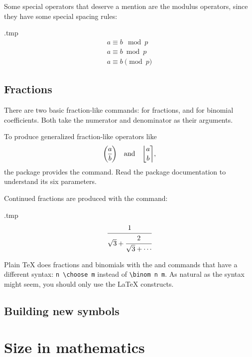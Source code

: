 
Some special operators that deserve a mention are the modulus operators,
since they have some special spacing rules:
%
\begin{VerbatimOut}{\jobname.tmp}
\begin{gather*}
a \equiv b \mod p\\
a \equiv b \bmod p\\
a \equiv b \pmod p
\end{gather*}
\end{VerbatimOut}
\ShowExample


%
%
\subsection{Fractions}
There are two basic fraction-like commands:  for fractions,
and  for binomial coefficients.
Both take the numerator and denominator as their arguments.

To produce generalized fraction-like operators like
\[
\genfrac{(}{)}{}{}{a}{b}
\quad\text{and}\quad
\genfrac{\lfloor}{\rceil}{0pt}{}{a}{b},
\]
the  package provides the  command.
Read the package documentation to understand its six parameters.

Continued fractions are produced with the  command:
%
\begin{VerbatimOut}{\jobname.tmp}
\[
\cfrac{1}{\sqrt 3 + \cfrac{2}{\sqrt 3 + \dotsb}}
\]
\end{VerbatimOut}
\ShowExample

\begin{warning}
Plain \TeX{} does fractions and binomials with the  and  commands
that have a different syntax: \verb|n \choose m| instead of \verb|\binom n m|.
As natural as the syntax might seem, you should only use the \LaTeX{} constructs.
\end{warning}


%
%
\subsection{Building new symbols}





%
%
%
\section{Size in mathematics}

